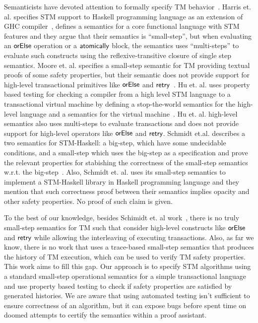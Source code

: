 \documentclass{fundam}
\newcommand{\F}[1]{\green{\mathsf{#1}}}
\begin{document}
Semanticists have devoted attention to formally specify TM behavior~\cite{Moore2008,Koskinen2010,Abadi2011,Harris05}.
Harris et. al. specifies STM support to Haskell programming language as an extension of GHC compiler~\cite{Harris05},
defines a semantics for a core functional language with STM features and they argue that their semantics is ``small-step'',
but when evaluating an \ensuremath{\F{orElse}} operation or a \ensuremath{\F{atomically}} block, the semantics uses ``multi-steps'' to evaluate such constructs
using the reflexive-transitive closure of single step semantics. Moore et. al. specifies a small-step semantic for TM providing
textual proofs of some safety properties, but their semantic does not provide support for high-level transactional primitives
like \ensuremath{\F{orElse}} and \ensuremath{\F{retry}}~\cite{Moore2008}. Hu et. al. uses property based testing for checking a compiler from a high level
STM language to a transactional virtual machine by defining a stop-the-world semantics for the high-level language and a semantics
for the virtual machine~\cite{Hu08}. Hu et. al. high-level semantics also uses multi-steps to evaluate transactions and does not
provide support for high-level operators like \ensuremath{\F{orElse}} and \ensuremath{\F{retry}}. Schmidt et.al. describes a two semantics for STM-Haskell:
a big-step, which have some undecidable conditions, and a small-step which uses the big-step as a specification and prove the relevant
properties for stabishing the correctness of the small-step semantics w.r.t. the big-step~\cite{Schmidt2013}. Also, Schmidt et. al.
uses its small-step semantics to implement a STM-Haskell library in Haskell programming language and they mention that such correctness
proof between their semantics implies opacity and other safety properties. No proof of such claim is given.

To the best of our knowledge, besides Schimidt et. al work~\cite{Schmidt2013}, there is no truly small-step semantics for TM such that
consider high-level constructs like \ensuremath{\F{orElse}} and \ensuremath{\F{retry}} while allowing the interleaving of executing transactions. Also, as far we know, there
is no work that uses a trace-based small-step semantics that produces the history of TM execution, which can be used to verify
TM safety properties. This work aims to fill this gap. Our approach is to specify STM algorithms using a standard small-step operational semantics
for a simple transactional language and use property based testing to check if safety properties are satisfied by generated histories.
We are aware that using automated testing isn't sufficient to ensure correctness of an algorithm, but it can expose bugs before spent time
on doomed attempts to certify the semantics within a proof assistant.
\end{document}
